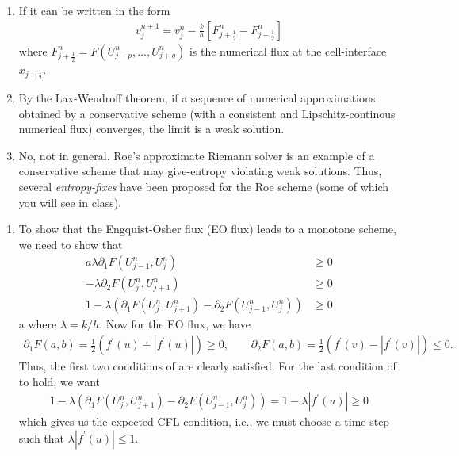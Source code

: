 \documentclass{article}
\newcommand{\jph}{{j+\frac{1}{2}}}
\newcommand{\jmh}{{j-\frac{1}{2}}}
\begin{document}






\begin{exerciseList}


\item
\begin{enumerate}
\item
If it can be written in the form
\begin{gather} \label{consForm}
	v_{j}^{n+1}=v_{j}^{n}-\frac{k}{h}\left[F^n_\jph-F^n_\jmh\right]
\end{gather}
where $F^n_\jph = F(U^n_{j-p},...,U^n_{j+q})$ is the numerical flux at the cell-interface $x_\jph$. 

\item
By the Lax-Wendroff theorem, if a sequence of numerical approximations obtained by a conservative scheme (with a consistent and Lipschitz-continous numerical flux) converges, the limit is a weak solution.

\item
No, not in general. Roe's approximate Riemann solver is an example of a conservative scheme that may give-entropy violating weak solutions. Thus, several \textit{entropy-fixes} have been proposed for the Roe scheme (some of which you will see in class).
\end{enumerate}

\item 
\begin{enumerate}
\item
To show that the Engquist-Osher flux (EO flux) leads to a monotone scheme, we need to show that
\begin{gather}a \label{eqn:m_flux}
\lambda \partial_1F(U^n_{j-1},U^n_j) &\geq 0\\
-\lambda \partial_2F(U^n_{j},U^n_{j+1}) &\geq 0\\
1 - \lambda ( \partial_1F(U^n_{j},U^n_{j+1}) - \partial_2F(U^n_{j-1},U^n_j) ) &\geq 0
\end{gather}a
where $\lambda = k/h$. Now for the EO flux, we have
\begin{gather}
\partial_1 F(a,b) = \frac{1}{2} \left( f^\prime(u) + |f^\prime(u)| \right) \geq 0, \qquad 
\partial_2 F(a,b) = \frac{1}{2} \left( f^\prime(v) - |f^\prime(v)| \right) \leq 0.
\end{gather}
Thus, the first two conditions of  are clearly satisfied. For the last condition of  to hold, we want
\begin{gather}
1 - \lambda ( \partial_1F(U^n_{j},U^n_{j+1}) - \partial_2F(U^n_{j-1},U^n_j) ) = 1 - \lambda |f^\prime(u)| \geq 0 
\end{gather}
which gives us the expected CFL condition, i.e., we must choose a time-step such that $\lambda |f^\prime(u)| \leq 1$.


\end{enumerate}
\end{exerciseList}
\end{document}
